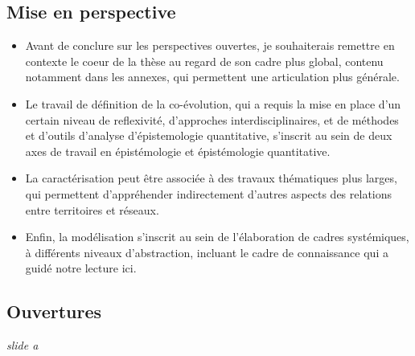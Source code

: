 \documentclass[12pt]{article}
\begin{document}
\newpage

\subsection*{Mise en perspective}

\begin{itemize}
	\item Avant de conclure sur les perspectives ouvertes, je souhaiterais remettre en contexte le coeur de la thèse au regard de son cadre plus global, contenu notamment dans les annexes, qui permettent une articulation plus générale.
	\item Le travail de définition de la co-évolution, qui a requis la mise en place d'un certain niveau de reflexivité, d'approches interdisciplinaires, et de méthodes et d'outils d'analyse d'épistemologie quantitative, s'inscrit au sein de deux axes de travail en épistémologie et épistémologie quantitative.
	\item La caractérisation peut être associée à des travaux thématiques plus larges, qui permettent d'appréhender indirectement d'autres aspects des relations entre territoires et réseaux.
	\item Enfin, la modélisation s'inscrit au sein de l'élaboration de cadres systémiques, à différents niveaux d'abstraction, incluant le cadre de connaissance qui a guidé notre lecture ici.
\end{itemize}


\newpage

\subsection*{Ouvertures}

\textit{slide a}
\end{document}
